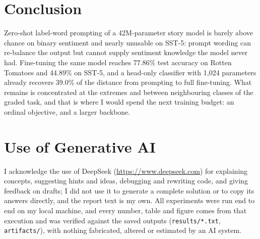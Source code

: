 \documentclass[11pt]{article}
\begin{document}
\section{Conclusion}
Zero-shot label-word prompting of a 42M-parameter story model is barely above chance on binary
sentiment and nearly unusable on SST-5: prompt wording can re-balance the output but
cannot supply sentiment knowledge the model never had. Fine-tuning the same model reaches
77.86\% test accuracy on Rotten Tomatoes and 44.89\% on SST-5, and a head-only classifier with
1{,}024 parameters already recovers 39.0\% of the distance from prompting to full fine-tuning.
What remains is concentrated at the extremes and between neighbouring classes of the graded
task, and that is where I would spend the next training budget: an ordinal objective, and a
larger backbone.

\section*{Use of Generative AI}
I acknowledge the use of DeepSeek (\url{https://www.deepseek.com}) for explaining concepts,
suggesting hints and ideas, debugging and rewriting code, and giving feedback on drafts; I did
not use it to generate a complete solution or to copy its answers directly, and the report text
is my own. All experiments were run end to end on my local machine, and every number, table and
figure comes from that execution and was verified against the saved outputs
(\texttt{results/*.txt}, \texttt{artifacts/}), with nothing fabricated, altered or estimated by
an AI system.

{\footnotesize

}
\end{document}

